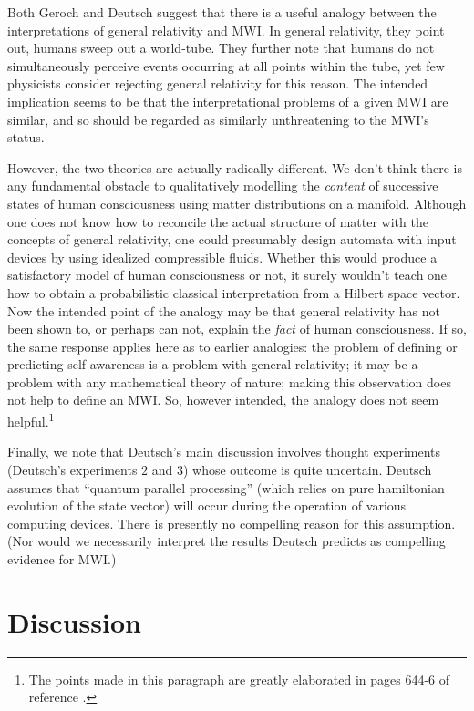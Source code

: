 \documentclass[aps,pra,12pt]{revtex4}
\begin{document}
Both Geroch and Deutsch suggest that there is a useful analogy
between the interpretations of general relativity and MWI.
In general relativity, they point out, humans sweep out a world-tube.
They further note that 
humans do not simultaneously perceive events occurring at all points within
the tube, yet few physicists consider rejecting general relativity for
this reason. 
The intended implication seems to be 
that the interpretational problems of a given MWI are 
similar, and so should be regarded as similarly unthreatening to the MWI's 
status. 

However, the two theories are actually radically different.
We don't think there is any fundamental obstacle to qualitatively
modelling the {\em content} of successive states of 
human consciousness using matter 
distributions on a manifold. 
Although one does not know how to reconcile the actual structure of matter
with the concepts of general relativity, one could presumably
design automata with input devices by
using idealized compressible fluids. 
Whether this would produce a satisfactory model of human
consciousness or not, it surely wouldn't teach one 
how to obtain a probabilistic classical interpretation from 
a Hilbert space vector. 
Now the intended point of the analogy may be that general relativity has not
been shown to,
or perhaps can not, explain the {\em fact} of human consciousness.  
If so, the same response applies here as to earlier analogies: the problem
of defining or predicting self-awareness is a problem with general relativity;
it may be a problem with any mathematical theory of nature; making this
observation does not help to define an MWI. 
So, however intended, the analogy does not seem helpful.\footnote{The points 
made in this paragraph are greatly elaborated in 
pages 644-6 of reference \cite{stein}.}

Finally, we note that Deutsch's main discussion involves thought
experiments (Deutsch's experiments $2$ and $3$) whose outcome is quite
uncertain. Deutsch assumes that ``quantum parallel processing''
(which relies on pure hamiltonian evolution of the state vector) will occur
during the operation of various computing devices.  There is presently
no compelling reason for this assumption. 
(Nor would we necessarily interpret the results Deutsch predicts as compelling
evidence for MWI.)

\section{Discussion} 
\end{document}

